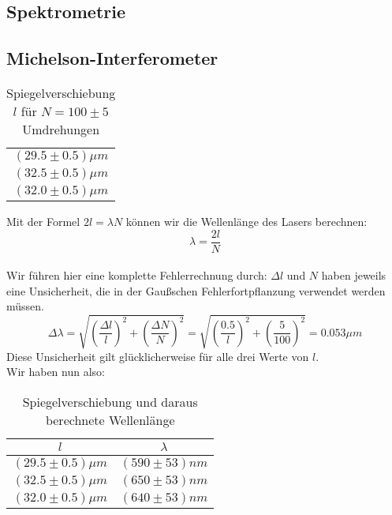 \documentclass{article}
\begin{document}
\subsection{Spektrometrie}

\subsection{Michelson-Interferometer}
\begin{table}[H]
\begin{center}
\begin{tabular}{c}
$(29.5\pm 0.5)\mu m$\\
$(32.5\pm 0.5)\mu m$\\
$(32.0\pm 0.5)\mu m$\\
\end{tabular}
\caption{Spiegelverschiebung $l$ für $N=100 \pm 5$ Umdrehungen}
\end{center}
\end{table}
\vspace{0.3mm}

Mit der Formel $2 l=\lambda N$ können wir die Wellenlänge des Lasers berechnen:
$$\lambda=\frac{2l}{N}$$
\\
Wir führen hier eine komplette Fehlerrechnung durch:
$\Delta l$ und $N$ haben jeweils eine Unsicherheit, die in der Gaußschen Fehlerfortpflanzung verwendet werden müssen.\\
$$\Delta \lambda=\sqrt{\left(\frac{\Delta l}{l}\right)^2+\left(\frac{\Delta N}{N}\right)^2}=\sqrt{\left(\frac{0.5}{l}\right)^2+\left(\frac{5}{100}\right)^2}=0.053 \mu m$$
Diese Unsicherheit gilt glücklicherweise für alle drei Werte von $l$.\\
Wir haben nun also: 
\begin{table}[H]
\begin{center}
\begin{tabular}{|c|c|}
\hline
$l$ & $\lambda$\\
\hline
$(29.5\pm 0.5)\mu m$ & $(590 \pm 53)nm$\\
$(32.5\pm 0.5)\mu m$ & $(650 \pm 53)nm$\\
$(32.0\pm 0.5)\mu m$ & $(640 \pm 53)nm$\\
\hline
\end{tabular}
\caption{Spiegelverschiebung und daraus berechnete Wellenlänge}
\end{center}
\end{table}
\vspace{0.3mm}
\end{document}
